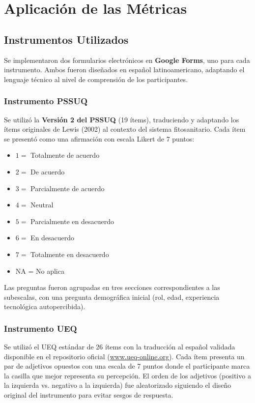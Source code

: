 \documentclass[a4paper,12pt]{report}
\begin{document}
\newpage

\chapter{Aplicación de las Métricas}

\section{Instrumentos Utilizados}

Se implementaron dos formularios electrónicos en \textbf{Google Forms}, uno para cada instrumento. Ambos fueron diseñados en español latinoamericano, adaptando el lenguaje técnico al nivel de comprensión de los participantes.

\subsection{Instrumento PSSUQ}

Se utilizó la \textbf{Versión 2 del PSSUQ} (19 ítems), traduciendo y adaptando los ítems originales de Lewis (2002) al contexto del sistema fitosanitario. Cada ítem se presentó como una afirmación con escala Likert de 7 puntos:

\begin{itemize}
    \item $1 =$ Totalmente de acuerdo
    \item $2 =$ De acuerdo
    \item $3 =$ Parcialmente de acuerdo
    \item $4 =$ Neutral
    \item $5 =$ Parcialmente en desacuerdo
    \item $6 =$ En desacuerdo
    \item $7 =$ Totalmente en desacuerdo
    \item NA = No aplica
\end{itemize}

Las preguntas fueron agrupadas en tres secciones correspondientes a las subescalas, con una pregunta demográfica inicial (rol, edad, experiencia tecnológica autopercibida).

\subsection{Instrumento UEQ}

Se utilizó el UEQ estándar de 26 ítems con la traducción al español validada disponible en el repositorio oficial (\url{www.ueq-online.org}). Cada ítem presenta un par de adjetivos opuestos con una escala de 7 puntos donde el participante marca la casilla que mejor representa su percepción. El orden de los adjetivos (positivo a la izquierda vs. negativo a la izquierda) fue aleatorizado siguiendo el diseño original del instrumento para evitar sesgos de respuesta.
\end{document}
